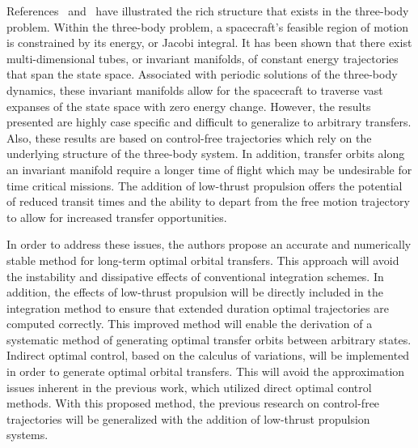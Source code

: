References~\cite{koon2000} and~\cite{ross2006} have illustrated the rich structure that exists in the three-body problem.
Within the three-body problem, a spacecraft's feasible region of motion is constrained by its energy, or Jacobi integral. 
It has been shown that there exist multi-dimensional tubes, or invariant manifolds, of constant energy trajectories that span the state space. 
Associated with periodic solutions of the three-body dynamics, these invariant manifolds allow for the spacecraft to traverse vast expanses of the state space with zero energy change. 
However, the results presented are highly case specific and difficult to generalize to arbitrary transfers.
Also, these results are based on control-free trajectories which rely on the underlying structure of the three-body system.
In addition, transfer orbits along an invariant manifold require a longer time of flight which may be undesirable for time critical missions.
The addition of low-thrust propulsion offers the potential of reduced transit times and the ability to depart from the free motion trajectory to allow for increased transfer opportunities. 

In order to address these issues, the authors propose an accurate and numerically stable method for long-term optimal orbital transfers.
This approach will avoid the instability and dissipative effects of conventional integration schemes.
In addition, the effects of low-thrust propulsion will be directly included in the integration method to ensure that extended duration optimal trajectories are computed correctly.
This improved method will enable the derivation of a systematic method of generating optimal transfer orbits between arbitrary states.
Indirect optimal control, based on the calculus of variations, will be implemented in order to generate optimal orbital transfers.
This will avoid the approximation issues inherent in the previous work, which utilized direct optimal control methods.
With this proposed method, the previous research on control-free trajectories will be generalized with the addition of low-thrust propulsion systems.

